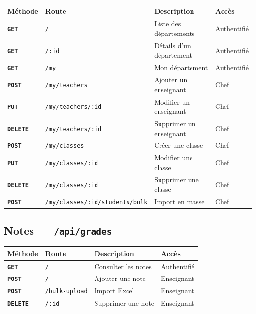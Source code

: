 \documentclass[12pt,a4paper]{article}
\newcommand{\route}[1]{\texorpdfstring{\texttt{\small\color{routeGray}#1}}{#1}}
\newcommand{\httpmethod}[1]{%
  \ifstrequal{#1}{GET}{\colorbox{blue!15}{\texttt{\bfseries\color{blue!70!black}GET}}}{}%
  \ifstrequal{#1}{POST}{\colorbox{green!18}{\texttt{\bfseries\color{green!60!black}POST}}}{}%
  \ifstrequal{#1}{PUT}{\colorbox{orange!18}{\texttt{\bfseries\color{orange!70!black}PUT}}}{}%
  \ifstrequal{#1}{DELETE}{\colorbox{red!15}{\texttt{\bfseries\color{red!70!black}DELETE}}}{}%
}
\begin{document}
\begin{center}
\small
\begin{tabular}{l>{\raggedright\arraybackslash}p{5.6cm}>{\raggedright\arraybackslash}p{4.4cm}l}
  \toprule
  \textbf{Méthode} & \textbf{Route} & \textbf{Description} & \textbf{Accès} \\
  \midrule
  \httpmethod{GET} & \texttt{/} & Liste des départements & Authentifié \\
  \httpmethod{GET} & \texttt{/:id} & Détails d'un département & Authentifié \\
  \httpmethod{GET} & \texttt{/my} & Mon département & Authentifié \\
  \httpmethod{POST} & \texttt{/my/teachers} & Ajouter un enseignant & Chef \\
  \httpmethod{PUT} & \texttt{/my/teachers/:id} & Modifier un enseignant & Chef \\
  \httpmethod{DELETE} & \texttt{/my/teachers/:id} & Supprimer un enseignant & Chef \\
  \httpmethod{POST} & \texttt{/my/classes} & Créer une classe & Chef \\
  \httpmethod{PUT} & \texttt{/my/classes/:id} & Modifier une classe & Chef \\
  \httpmethod{DELETE} & \texttt{/my/classes/:id} & Supprimer une classe & Chef \\
  \httpmethod{POST} & \texttt{/my/classes/:id/students/}\newline\texttt{bulk} & Import en masse & Chef \\
  \bottomrule
\end{tabular}
\end{center}

\subsection{Notes — \route{/api/grades}}

\begin{center}
\begin{tabular}{l>{\raggedright\arraybackslash}p{5.6cm}>{\raggedright\arraybackslash}p{4.4cm}l}
  \toprule
  \textbf{Méthode} & \textbf{Route} & \textbf{Description} & \textbf{Accès} \\
  \midrule
  \httpmethod{GET} & \texttt{/} & Consulter les notes & Authentifié \\
  \httpmethod{POST} & \texttt{/} & Ajouter une note & Enseignant \\
  \httpmethod{POST} & \texttt{/bulk-upload} & Import Excel & Enseignant \\
  \httpmethod{DELETE} & \texttt{/:id} & Supprimer une note & Enseignant \\
  \bottomrule
\end{tabular}
\end{center}
\end{document}

